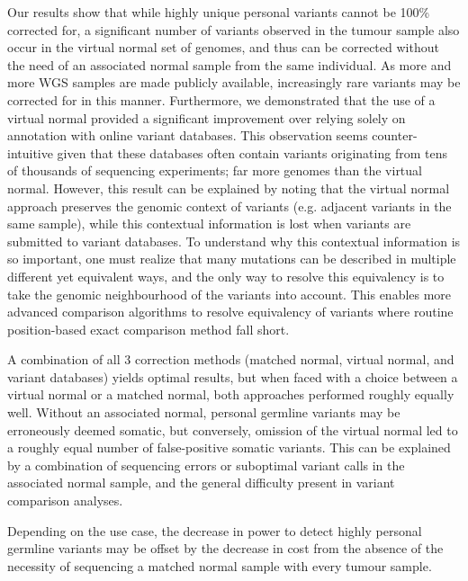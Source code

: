 Our results show that while highly unique personal variants cannot be 100\% corrected for, a significant number of variants observed in the tumour sample also occur in the virtual normal set of genomes, and thus can be corrected without the need of an associated normal sample from the same individual. As more and more WGS samples are made publicly available, increasingly rare variants may be corrected for in this manner. Furthermore, we demonstrated that the use of a virtual normal provided a significant improvement over relying solely on annotation with online variant databases. This observation seems counter-intuitive given that these databases often contain variants originating from tens of thousands of sequencing experiments; far more genomes than the virtual normal. However, this result can be explained by noting that the virtual normal approach preserves the genomic context of variants (e.g. adjacent variants in the same sample), while this contextual information is lost when variants are submitted to variant databases. To understand why this contextual information is so important, one must realize that many mutations can be described in multiple different yet equivalent ways, and the only way to resolve this equivalency is to take the genomic neighbourhood of the variants into account. This enables more advanced comparison algorithms to resolve equivalency of variants where routine position-based exact comparison method fall short.

A combination of all 3 correction methods (matched normal, virtual normal, and variant databases) yields optimal results, but when faced with a choice between a virtual normal or a matched normal, both approaches performed roughly equally well. Without an associated normal, personal germline variants may be erroneously deemed somatic, but conversely, omission of the virtual normal led to a roughly equal number of false-positive somatic variants. This can be explained by a combination of sequencing errors or suboptimal variant calls in the associated normal sample, and the general difficulty present in variant comparison analyses.

Depending on the use case, the decrease in power to detect highly personal germline variants may be offset by the decrease in cost from the absence of the necessity of sequencing a matched normal sample with every tumour sample.

